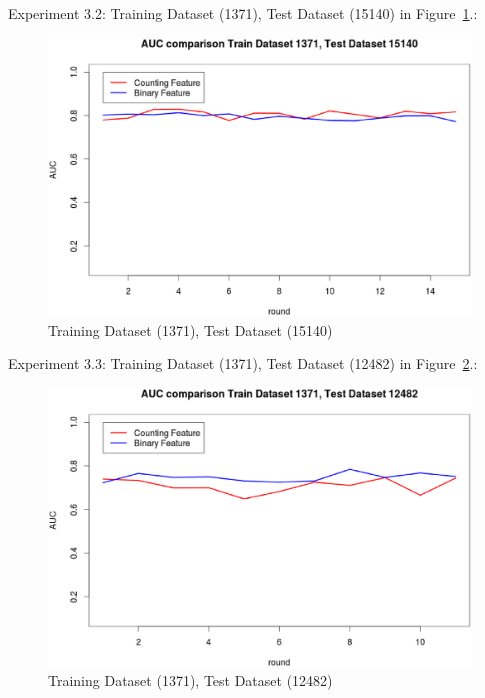 \documentclass{sig-alternate}
\begin{document}
Experiment 3.2: Training Dataset  (1371), Test Dataset  (15140) in Figure~\ref{fig:fig7}.:
\begin{figure}[h]
\centering
\includegraphics[width=\columnwidth]{1371_15140.eps}
\caption{Training Dataset  (1371), Test Dataset  (15140)}
\label{fig:fig7}
\end{figure}

Experiment 3.3: Training Dataset  (1371), Test Dataset  (12482) in Figure~\ref{fig:fig8}.:
\begin{figure}[h]
\centering
\includegraphics[width=\columnwidth]{1371_12482.eps}
\caption{Training Dataset  (1371), Test Dataset  (12482)}
\label{fig:fig8}
\end{figure}
\end{document}
